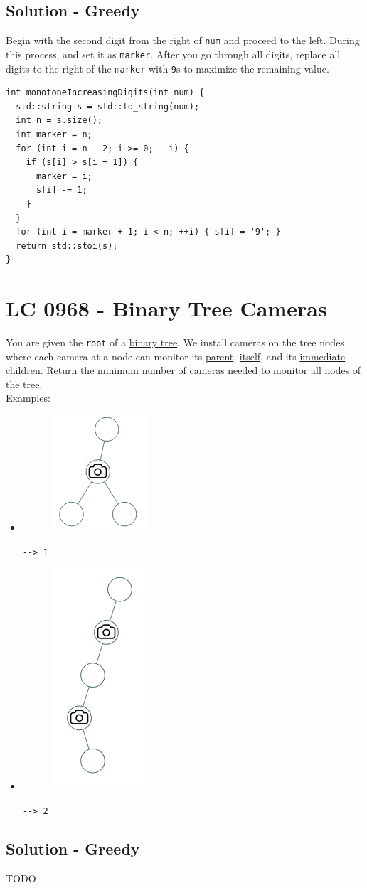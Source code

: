 \subsection*{Solution - Greedy}
Begin with the second digit from the right of {\colorbox{CodeBackground}{\lstinline|num|}} and proceed to the left.  During this process, {\color{magenta}{if you find a digit that violates the monotone increasing rule, decrease the digit}} and set it as {\colorbox{CodeBackground}{\lstinline|marker|}}. After you go through all digits, replace all digits to the right of the {\colorbox{CodeBackground}{\lstinline|marker|}} with {\colorbox{CodeBackground}{\lstinline|9|}}s to maximize the remaining value.

\begin{lstlisting}
int monotoneIncreasingDigits(int num) {
  std::string s = std::to_string(num);
  int n = s.size();
  int marker = n;
  for (int i = n - 2; i >= 0; --i) {
    if (s[i] > s[i + 1]) {
      marker = i;
      s[i] -= 1;
    }
  }
  for (int i = marker + 1; i < n; ++i) { s[i] = '9'; }
  return std::stoi(s);
}
\end{lstlisting}

\section{LC 0968 - Binary Tree Cameras}
You are given the {\colorbox{CodeBackground}{\lstinline|root|}} of a \ul{binary tree}. We install cameras on the tree nodes where each camera at a node can monitor its \ul{parent}, \ul{itself}, and its \ul{immediate children}. Return the minimum number of cameras needed to monitor all nodes of the tree.\\

Examples:
\begin{itemize}
	\item 
	\begin{figure}[H]
		\centering
		\includegraphics[width=0.15\linewidth]{images/lc0968_example1}
		\label{fig:lc0968example1}
	\end{figure}
	{\colorbox{CodeBackground}{\lstinline|--> 1|}}
	\item 
	\begin{figure}[H]
		\centering
		\includegraphics[width=0.15\linewidth]{images/lc0968_example2}
		\label{fig:lc0968example2}
	\end{figure}
	{\colorbox{CodeBackground}{\lstinline|--> 2|}}
\end{itemize}

\subsection*{Solution - Greedy}
TODO